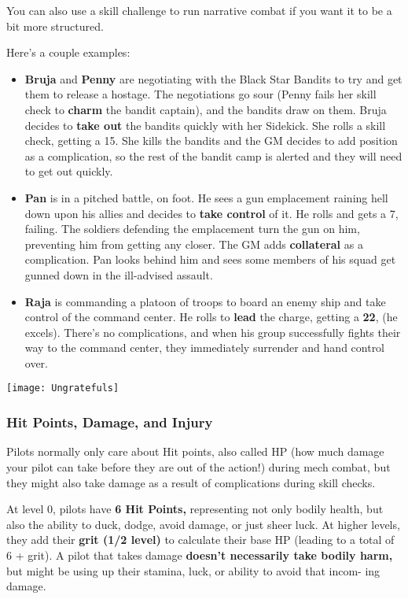You can also use a skill challenge to run narrative combat if you want it to be a bit more structured. 

Here’s a couple examples:
\begin{itemize}
\item \textbf{Bruja} and \textbf{Penny} are negotiating with the Black Star Bandits to try and get them to release a hostage. The negotiations go sour (Penny fails her skill check to \textbf{charm} the bandit captain), and the bandits draw on them. Bruja decides to \textbf{take out} the bandits quickly with her Sidekick. She rolls a skill check, getting a 15. She kills the bandits and the GM decides to add position as a complication, so the rest of the bandit camp is alerted and they will need to get out quickly.
\item \textbf{Pan} is in a pitched battle, on foot. He sees a gun emplacement raining hell down upon his allies and decides to \textbf{take control} of it. He rolls and gets a 7, failing. The soldiers defending the emplacement turn the gun on him, preventing him from getting any closer. The GM adds \textbf{collateral} as a complication. Pan looks behind him and sees some members of his squad get gunned down in the ill-advised assault.
\item \textbf{Raja} is commanding a platoon of troops to board an enemy ship and take control of the command center. He rolls to \textbf{lead} the charge, getting a \textbf{22}, (he excels). There’s no complications, and when his group successfully fights their way to the command center, they immediately surrender and hand control over.
\end{itemize}  

\newpage
\begin{center}
  \texttt{[image: Ungratefuls]}
\end{center}
\subsubsection{Hit Points, Damage, and Injury}

Pilots normally only care about Hit points, also called HP (how much damage your pilot can take before they are out of the action!) during mech combat, but they might also take damage as a result of complications during skill checks.

At level 0, pilots have \textbf{6 Hit Points,} representing not only bodily
health, but also the ability to duck, dodge, avoid damage, or just sheer luck.
At higher levels, they add their \textbf{grit (1/2 level)} to calculate their
base HP (leading to a total of 6 + grit). A pilot that takes damage
\textbf{doesn’t necessarily take bodily harm,} but might be using up their
stamina, luck, or ability to avoid that incom- ing damage.

